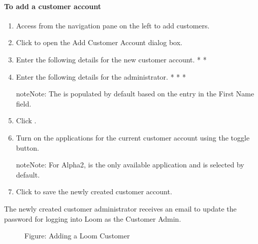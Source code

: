 \documentclass[letterpaper,10pt,english]{sphinxmanual}
\begin{document}
\paragraph{To add a customer account}
\label{\detokenize{loom_getting_started_guide:to-add-a-customer-account}}\begin{enumerate}
\item {} 
Access  from the navigation pane on the left to add customers.

\item {} 
Click  to open the Add Customer Account dialog box.

\item {} 
Enter the following details for the new customer account.
* 
* 

\item {} 
Enter the following details for the administrator.
* 
* 
* 

\begin{sphinxadmonition}{note}{Note:}
The  is populated by default based on the entry in the First Name field.
\end{sphinxadmonition}

\item {} 
Click .

\item {} 
Turn on the applications for the current customer account using the toggle button.

\begin{sphinxadmonition}{note}{Note:}
For Alpha2,  is the only available application and is selected by default.
\end{sphinxadmonition}

\item {} 
Click  to save the newly created customer account.

\end{enumerate}

The newly created customer administrator receives an email to update the password for logging into Loom as the Customer Admin.

\begin{figure}[htbp]
\centering
\capstart

\noindent{}
\caption{Figure: Adding a Loom Customer}\label{\detokenize{loom_getting_started_guide:id36}}\end{figure}
\end{document}
